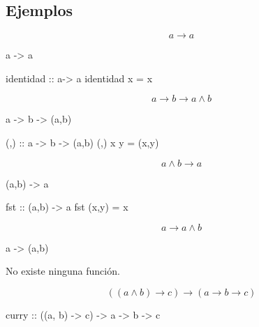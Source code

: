 \documentclass{beamer}
\begin{document}
\subsection{Ejemplos}
\begin{frame}[fragile]  
  $$a \rightarrow a$$
\pause
\begin{sesion}
a -> a
\end{sesion}
\pause
\begin{code}
identidad :: a-> a
identidad x = x
\end{code}  

\end{frame}

\begin{frame}[fragile]
  $$a \rightarrow b \rightarrow a\wedge b $$
\pause

\begin{sesion}
a -> b -> (a,b)
\end{sesion}
\pause

\begin{code}
(,) :: a -> b -> (a,b)
(,) x y = (x,y)
\end{code}

\end{frame}

\begin{frame}[fragile]
  $$a \wedge b \rightarrow a $$
\pause

\begin{sesion}  
(a,b) -> a
\end{sesion}

\pause

\begin{code}
fst :: (a,b) -> a
fst (x,y) = x
\end{code}

\end{frame}

\begin{frame}[fragile]
  $$a \rightarrow a\wedge b $$

\pause
\begin{sesion}
a -> (a,b)
\end{sesion}
  
\pause
No existe ninguna función.
\end{frame}

\begin{frame}[fragile]
  $$((a\wedge b) \rightarrow c) \rightarrow (a \rightarrow b \rightarrow c) $$
\pause
  
\begin{code}
curry :: ((a, b) -> c) -> a -> b -> c
  
\end{code}
\end{frame}
\end{document}
